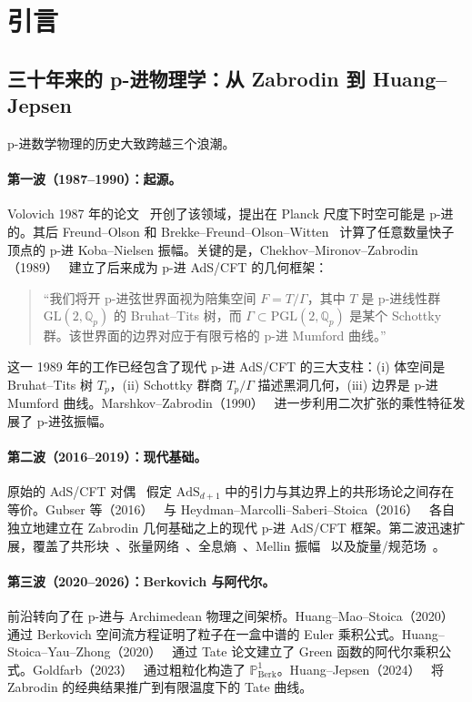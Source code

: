 \documentclass[11pt,a4paper]{ctexart}
\theoremstyle{remark}
\newcommand{\Qp}{\mathbb{Q}_p}
\newcommand{\PoneBerk}{\mathbb{P}^1_{\mathrm{Berk}}}
\newcommand{\Tp}{T_p}
\newcommand{\PGL}{\mathrm{PGL}}
\newcommand{\GL}{\mathrm{GL}}
\newcommand{\AdS}{\mathrm{AdS}}
\newcommand{\BirTits}{Bruhat--Tits}
\begin{document}
\section{引言}
\label{sec:intro}

\subsection{三十年来的 p-进物理学：从 Zabrodin 到 Huang--Jepsen}

p-进数学物理的历史大致跨越三个浪潮。

\paragraph{第一波（1987--1990）：起源。}
Volovich 1987 年的论文~\cite{V87} 开创了该领域，提出在 Planck 尺度下时空可能是 p-进的。其后 Freund--Olson 和 Brekke--Freund--Olson--Witten~\cite{BFO88} 计算了任意数量快子顶点的 p-进 Koba--Nielsen 振幅。关键的是，Chekhov--Mironov--Zabrodin（1989）~\cite{CMZ89} 建立了后来成为 p-进 AdS/CFT 的几何框架：

\begin{quote}
``我们将开 p-进弦世界面视为陪集空间 $F = T/\Gamma$，其中 $T$ 是 p-进线性群 $\GL(2, \Qp)$ 的 \BirTits{} 树，而 $\Gamma \subset \PGL(2, \Qp)$ 是某个 Schottky 群。该世界面的边界对应于有限亏格的 p-进 Mumford 曲线。''
\end{quote}

这一 1989 年的工作已经包含了现代 p-进 AdS/CFT 的三大支柱：(i) 体空间是 \BirTits{} 树 $\Tp$，(ii) Schottky 群商 $\Tp/\Gamma$ 描述黑洞几何，(iii) 边界是 p-进 Mumford 曲线。Marshkov--Zabrodin（1990）~\cite{MZ90} 进一步利用二次扩张的乘性特征发展了 p-进弦振幅。

\paragraph{第二波（2016--2019）：现代基础。}
原始的 AdS/CFT 对偶~\cite{M97,GKP98,W98} 假定 $\AdS_{d+1}$ 中的引力与其边界上的共形场论之间存在等价。Gubser 等（2016）~\cite{G16} 与 Heydman--Marcolli--Saberi--Stoica（2016）~\cite{HMSS16} 各自独立地建立在 Zabrodin 几何基础之上的现代 p-进 AdS/CFT 框架。第二波迅速扩展，覆盖了共形块~\cite{P19,JP19a}、张量网络~\cite{HLM19}、全息熵~\cite{HMPS18}、Mellin 振幅~\cite{JP19b} 以及旋量/规范场~\cite{GJT19,HLM19b}。

\paragraph{第三波（2020--2026）：Berkovich 与阿代尔。}
前沿转向了在 p-进与 Archimedean 物理之间架桥。Huang--Mao--Stoica（2020）~\cite{HMS20} 通过 Berkovich 空间流方程证明了粒子在一盒中谱的 Euler 乘积公式。Huang--Stoica--Yau--Zhong（2020）~\cite{HSYZ20} 通过 Tate 论文建立了 Green 函数的阿代尔乘积公式。Goldfarb（2023）~\cite{G23} 通过粗粒化构造了 $\PoneBerk$。Huang--Jepsen（2024）~\cite{HJ24} 将 Zabrodin 的经典结果推广到有限温度下的 Tate 曲线。
\end{document}
